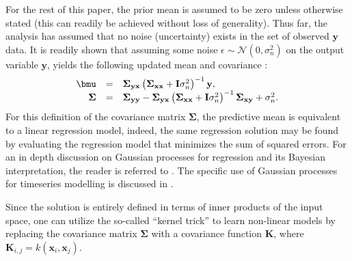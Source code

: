 \documentclass[useAMS,usenatbib,fleqn]{mn2e}
\begin{document}
For the rest of this paper, the prior mean is assumed to be zero unless otherwise stated (this can readily be achieved without loss of generality). Thus far, the analysis has assumed that no noise (uncertainty) exists in the set of observed $\mathbf{y}$ data. It is readily shown that assuming some noise $\epsilon \sim \mathcal{N}\left(0,\sigma_{n}^{2}\right)$ on the output variable $\mathbf{y}$, yields the following updated mean and covariance \citep{rasmussen2006gaussian}:
\begin{equation}
\label{eq-mean-variance-noise}
\begin{array}{rcl}
\bmu &=& \mathbf\Sigma_{\mathbf{y}\mathbf{x}}\left(\mathbf\Sigma_{\mathbf{x}\mathbf{x}}+\mathbf{I}\sigma_{n}^{2}\right)^{-1}\mathbf{y},\\
\mathbf\Sigma &=& \mathbf\Sigma_{\mathbf{y}\mathbf{y}}-\mathbf\Sigma_{\mathbf{y}\mathbf{x}}\left(\mathbf\Sigma_{\mathbf{x}\mathbf{x}}+\mathbf{I}\sigma_{n}^{2}\right)^{-1}\mathbf\Sigma_{\mathbf{x}\mathbf{y}}+\sigma_{n}^{2}.
\end{array}
\end{equation}
For this definition of the covariance matrix $\mathbf\Sigma$, the predictive mean is equivalent to a linear regression model, indeed, the same regression solution may be found by evaluating the regression model that minimizes the sum of squared errors. For an in depth discussion on Gaussian processes for regression and its Bayesian interpretation, the reader is referred to \citet{rasmussen2006gaussian}. The specific use of Gaussian processes for timeseries modelling is discussed in \citet{roberts2012rs}.

Since the solution is entirely defined in terms of inner products of the input space, one can utilize the so-called ``kernel trick'' to learn non-linear models by replacing the covariance matrix $\mathbf\Sigma$ with a covariance function $\mathbf{K}$, where $\mathbf{K}_{i,j} = k(\mathbf{x}_{i},\mathbf{x}_{j})$.
\end{document}
